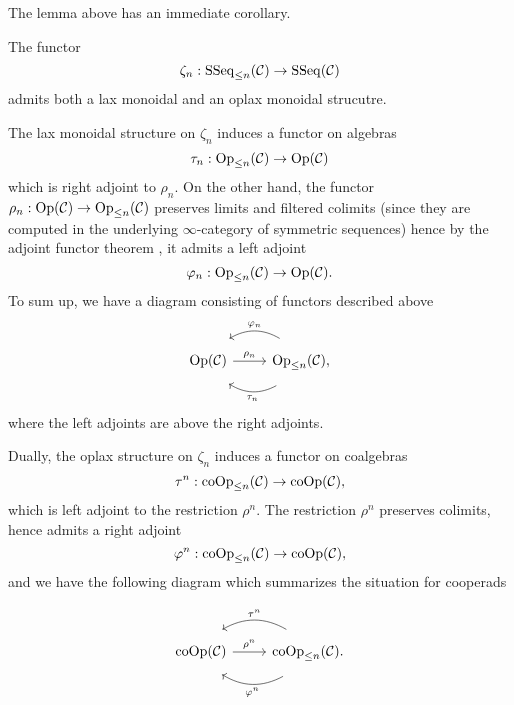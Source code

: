 The lemma above has an immediate corollary.
\begin{corollary}
\label{functors between operads adn their truncations}
    The functor 
    $$
    \zeta_n: \operatorname{SSeq}_{\leq n}({\mathcal{C}}) \to \operatorname{SSeq}({\mathcal{C}})
    $$
    admits both a lax monoidal and an oplax monoidal strucutre. 
\end{corollary}
    The lax monoidal structure on $\zeta_n$ induces a functor on algebras
    $$
    \tau_{n}:\operatorname{Op}_{\leq n}({\mathcal{C}})
    \to 
    \operatorname{Op}({\mathcal{C}})
    $$
    which is right adjoint to $\rho_{n}$. On the other hand, the functor $\rho_n:\operatorname{Op}({\mathcal{C}}) \to \operatorname{Op}_{\leq n}({\mathcal{C}})$ preserves limits and filtered colimits (since they are computed in the underlying $\infty$-category of symmetric sequences) hence by the adjoint functor theorem \cite[Corollary 5.5.2.9.]{HTT}, it admits a left adjoint 
    $$
    \varphi_n: \operatorname{Op}_{\leq n}({\mathcal{C}})
    \to 
    \operatorname{Op}({\mathcal{C}}).
    $$
    To sum up, we have a diagram consisting of functors described above
\begin{equation}
\label{Op-Op_n adjunction}
	\begin{tikzcd}
 \Opd(\CC) & \operatorname{Op}_{\leq n}(\CC),
	\arrow[from=1-2, to= 1-1, bend right, shift right = 3, "\varphi_n" above]
	\arrow[from=1-2, to=1-1, bend left, shift left = 3, "\tau_n" below]
	\arrow[from=1-1, to=1-2, "\rho_n"]
\end{tikzcd}
\end{equation}
where the left adjoints are above the right adjoints.
    

    
    Dually, the oplax structure on $\zeta_n$ induces a functor on coalgebras
    $$
    \tau^{n}:\operatorname{coOp}_{\leq n}({\mathcal{C}})
    \to 
    \operatorname{coOp}({\mathcal{C}}),
    $$
    which is left adjoint to the restriction $\rho^n$. The restriction $\rho^n$ preserves colimits, hence admits a right adjoint
    $$
    \varphi^{n}: \operatorname{coOp}_{\leq n}({\mathcal{C}})
    \to 
    \operatorname{coOp}({\mathcal{C}}),
    $$
    and we have the following diagram which summarizes the situation for cooperads
    
    \begin{equation}
\label{coOp-coOp_n adjunction}
	\begin{tikzcd}
\Coop(\CC) & \operatorname{coOp}_{\leq n}(\CC)
	\arrow[from=1-2, to= 1-1, bend right, shift right = 3, "\tau^n" above]
	\arrow[from=1-2, to=1-1, bend left, shift left = 3, "\varphi^n" below]
	\arrow[from=1-1, to=1-2, "\rho^n"].
\end{tikzcd}
\end{equation}


